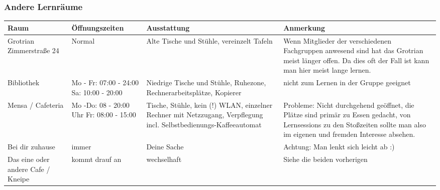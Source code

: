 	\subsubsection*{Andere Lernräume}
		\begin{tabular}{|p{4cm}|p{4cm}|p{3.6cm}|p{4cm}|}
 			\hline Raum & Öffnungszeiten & Ausstattung & Anmerkung  \\  
			\hline Grotrian  Zimmerstraße 24 & Normal  & Alte Tische und Stühle, vereinzelt Tafeln & Wenn Mitglieder der verschiedenen Fachgruppen anwesend sind hat das Grotrian meist länger offen. Da dies oft der Fall ist kann man hier meist lange lernen. \\ 
			\hline Bibliothek & Mo - Fr: 07:00 - 24:00 Sa: 10:00 - 20:00& Niedrige Tische und Stühle, Ruhezone, Rechnerarbeits\-plätze, Kopierer &  nicht zum  Lernen in der Gruppe  geeignet \\ 
			\hline Mensa / Cafeteria & Mo -Do: 08 - 20:00 Uhr Fr: 08:00 - 15:00 & Tische, Stühle, kein (!) WLAN, einzelner Rechner mit Netzzugang, Verpflegung incl. Selbstbedienungs-Kaffeeautomat& Probleme: Nicht durchgehend geöffnet, die Plätze sind primär zu Essen gedacht, von Lernsessions zu den Stoßzeiten sollte man also im eigenen und fremden Interesse absehen. \\ 
			\hline Bei dir zuhause & immer & Deine Sache & Achtung: Man lenkt sich leicht ab :) \\ 
			\hline Das eine oder andere Cafe / Kneipe & kommt drauf an & wechselhaft &Siehe die beiden vorherigen \\
			\hline
		\end{tabular}
